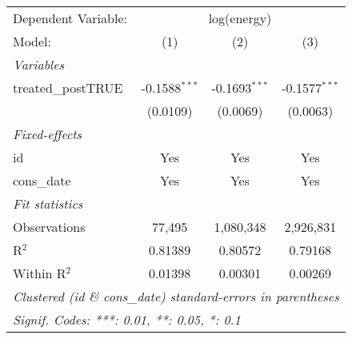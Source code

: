 
\begingroup
\centering
\begin{tabular}{lccc}
   \tabularnewline \midrule \midrule
   Dependent Variable: & \multicolumn{3}{c}{log(energy)}\\
   Model:             & (1)             & (2)             & (3)\\  
   \midrule
   \emph{Variables}\\
   treated\_postTRUE  & -0.1588$^{***}$ & -0.1693$^{***}$ & -0.1577$^{***}$\\   
                      & (0.0109)        & (0.0069)        & (0.0063)\\   
   \midrule
   \emph{Fixed-effects}\\
   id                 & Yes             & Yes             & Yes\\  
   cons\_date         & Yes             & Yes             & Yes\\  
   \midrule
   \emph{Fit statistics}\\
   Observations       & 77,495          & 1,080,348       & 2,926,831\\  
   R$^2$              & 0.81389         & 0.80572         & 0.79168\\  
   Within R$^2$       & 0.01398         & 0.00301         & 0.00269\\  
   \midrule \midrule
   \multicolumn{4}{l}{\emph{Clustered (id \& cons\_date) standard-errors in parentheses}}\\
   \multicolumn{4}{l}{\emph{Signif. Codes: ***: 0.01, **: 0.05, *: 0.1}}\\
\end{tabular}
\par\endgroup


